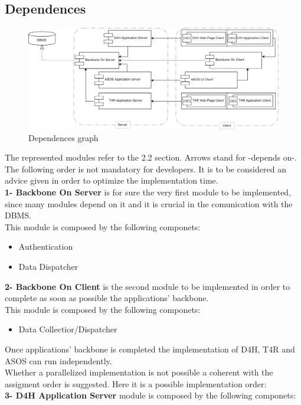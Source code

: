 \subsection{Dependences}
\begin{figure}[H]
\caption{Dependences graph}
\includegraphics[width = \textwidth]{sections/implementationIntegrationTestGraphs/DependenciesGraph.png}
\end{figure}
The represented modules refer to the 2.2 section. Arrows stand for -depends on-.\\
The following order is not mandatory for developers. It is to be considered an advice given in order to optimize the implementation time.\\
\textbf{1- Backbone On Server} is for sure the very first module to be implemented, since many modules depend on it and it is crucial in the comunication with the DBMS.\\ This module is composed by the following componets:
\begin{itemize}
\item Authentication
\item Data Dispatcher
\end{itemize}
 \textbf{2- Backbone On Client} is the second module to be implemented in order to complete as soon as possible the applications' backbone.\\ This module is composed by the following componets:
\begin{itemize}
\item Data Collectior/Dispatcher
\end{itemize}
Once applications' backbone is completed the implementation of D4H, T4R and ASOS can run independently.\\ Whether a parallelized implementation is not possible a coherent with the assigment order is suggested. Here it is a possible implementation order:\\
 \textbf{3- D4H Application Server} module is composed by the following componets:
